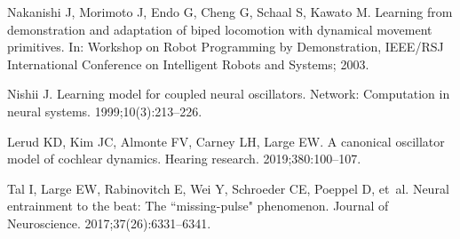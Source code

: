 \documentclass[10pt,letterpaper]{article}
\begin{document}
\begin{thebibliography}{10}
Nakanishi J, Morimoto J, Endo G, Cheng G, Schaal S, Kawato M.
\newblock Learning from demonstration and adaptation of biped locomotion with
  dynamical movement primitives.
\newblock In: Workshop on Robot Programming by Demonstration, IEEE/RSJ
  International Conference on Intelligent Robots and Systems; 2003.

Nishii J.
\newblock Learning model for coupled neural oscillators.
\newblock Network: Computation in neural systems. 1999;10(3):213--226.

Lerud KD, Kim JC, Almonte FV, Carney LH, Large EW.
\newblock A canonical oscillator model of cochlear dynamics.
\newblock Hearing research. 2019;380:100--107.

Tal I, Large EW, Rabinovitch E, Wei Y, Schroeder CE, Poeppel D, et~al.
\newblock Neural entrainment to the beat: The ``missing-pulse" phenomenon.
\newblock Journal of Neuroscience. 2017;37(26):6331--6341.

\end{thebibliography}


%
%
% 
%
%
%
%


%
\end{document}

